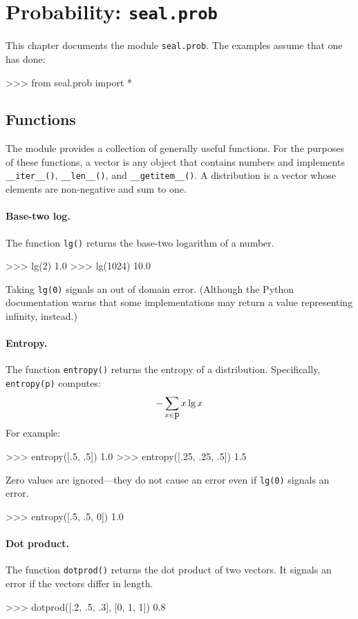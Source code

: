 
\section{Probability: {\tt seal.prob}}

This chapter documents the module {\tt seal.prob}.  The examples
assume that one has done:
\begin{python}
>>> from seal.prob import *
\end{python}

\subsection{Functions}

The module provides a collection of generally useful functions.  For
the purposes of these functions, a {\df vector} is any object that
contains numbers and implements \verb|__iter__()|, \verb|__len__()|,
and \verb|__getitem__()|.  A {\df distribution} is a vector whose
elements are non-negative and sum to one.

\paragraph{Base-two log.}  The function {\tt lg()} returns the
base-two logarithm of a number.
\begin{python}
>>> lg(2)
1.0
>>> lg(1024)
10.0
\end{python}
Taking {\tt lg(0)} signals an out of domain error.  (Although
the Python documentation warns that some implementations may return a value
representing infinity, instead.)

\paragraph{Entropy.}  The function {\tt entropy()} returns the entropy
of a distribution.  Specifically, {\tt entropy(p)} computes:
\[ -\sum_{x \in \mbox{\tt p}} x \lg x \]
For example:
\begin{python}
>>> entropy([.5, .5])
1.0
>>> entropy([.25, .25, .5])
1.5
\end{python}
Zero values are ignored---they do not cause an error even if
{\tt lg(0)} signals an error.
\begin{python}
>>> entropy([.5, .5, 0])
1.0
\end{python}

\paragraph{Dot product.}  The function {\tt dotprod()} returns the dot
product of two vectors.  It signals an error if the vectors differ in
length.
\begin{python}
>>> dotprod([.2, .5, .3], [0, 1, 1])
0.8
\end{python}

